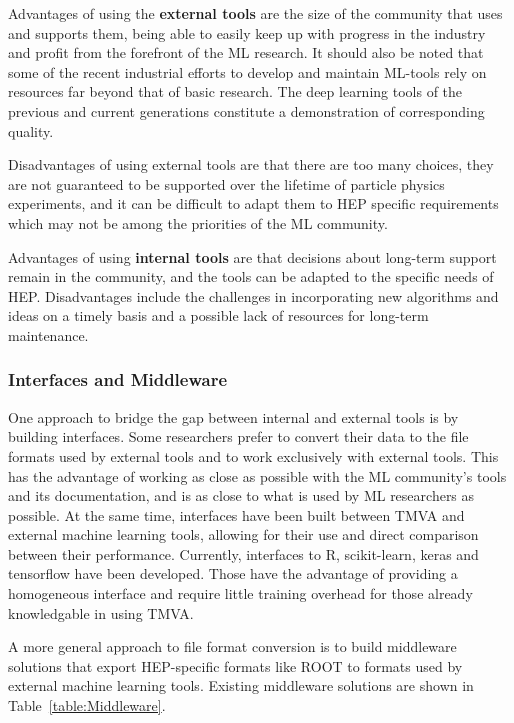 Advantages of using the {\bf external tools} are the size of the community that uses and supports them, being able to easily keep up with progress in the industry and profit from the forefront of the ML research.
It should also be noted that some of the recent industrial efforts to develop and maintain ML-tools rely on resources far beyond that of basic research. The deep learning tools of the previous and current generations constitute a demonstration of corresponding quality.

Disadvantages of using external tools are that there are too many choices, they are not guaranteed to be supported over the lifetime of particle physics experiments, and it can be difficult to adapt them to HEP specific requirements which may not be among the priorities of the ML community.

Advantages of using {\bf internal tools} are that decisions about long-term support remain in the community, and the tools can be adapted to the specific needs of HEP. Disadvantages include the challenges in incorporating new algorithms and ideas on a timely basis and a possible lack of resources for long-term maintenance.

\subsubsection{Interfaces and Middleware}

One approach to bridge the gap between internal and external tools is by building interfaces. Some researchers prefer to convert their data to the file formats used by external tools and to work exclusively with external tools. This has the advantage of working as close as possible with the ML community's tools and its documentation, and is as close to what is used by ML researchers as possible.
At the same time, interfaces have been built between TMVA and external machine learning tools, allowing for their use and direct comparison between their performance. Currently, interfaces to R, scikit-learn, keras and tensorflow have been developed. Those have the advantage of providing a homogeneous interface and require little training overhead for those already knowledgable in using TMVA.

A more general approach to file format conversion is to build middleware solutions that export HEP-specific formats like ROOT to formats used by external machine learning tools.
Existing middleware solutions are shown in Table~\ref{table:Middleware}.

